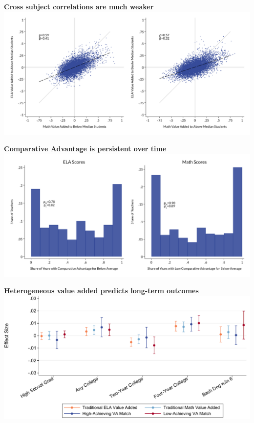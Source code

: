 \documentclass[t,aspectratio=169,11pt,presentation]{beamer}
\begin{document}
\begin{frame}[c,label=cross]{\textbf{Cross subject correlations are much weaker}}
\centering
 \includegraphics[width=.95\textwidth]{Working_Slides/WS_Figures/A2_crossVA.pdf}
 \raggedright
 \vfill
 \hyperlink{effects}{}
\end{frame}

\begin{frame}[c,label=persistence]{\textbf{Comparative Advantage is persistent over time}}
\centering
 \includegraphics[width=.95\textwidth]{Working_Slides/WS_Figures/02b_VA.pdf}
 \raggedright
 \vfill
 \hyperlink{effects1}{}
\end{frame}

\begin{frame}[c,label=longrun]{\textbf{Heterogeneous value added predicts long-term outcomes}}
\centering
 \includegraphics[width=.95\textwidth]{slides/Figures/fig2b_longterm.pdf}
 \raggedright
 \vfill
 \hyperlink{effects2}{}
\end{frame}
\end{document}
